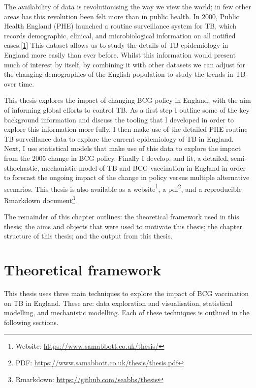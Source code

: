 \documentclass[11pt,twoside]{bristolthesis}
\begin{document}
  The availability of data is revolutionising the way we view the world; in few other areas has this revolution been felt more than in public health. In 2000, Public Health England (PHE) launched a routine surveillance system for TB, which records demographic, clinical, and microbiological information on all notified cases.{[}\protect\hyperlink{ref-PHE2017}{1}{]} This dataset allows us to study the details of TB epidemiology in England more easily than ever before. Whilst this information would present much of interest by itself, by combining it with other datasets we can adjust for the changing demographics of the English population to study the trends in TB over time.
  
  This thesis explores the impact of changing BCG policy in England, with the aim of informing global efforts to control TB. As a first step I outline some of the key background information and discuss the tooling that I developed in order to explore this information more fully. I then make use of the detailed PHE routine TB surveillance data to explore the current epidemiology of TB in England. Next, I use statistical models that make use of this data to explore the impact from the 2005 change in BCG policy. Finally I develop, and fit, a detailed, semi-sthochastic, mechanistic model of TB and BCG vaccination in England in order to forecast the ongoing impact of the change in policy versus multiple alternative scenarios. This thesis is also available as a website\footnote{Website: \url{https://www.samabbott.co.uk/thesis/}}, a pdf\footnote{PDF: \url{https://www.samabbott.co.uk/thesis/thesis.pdf}}, and a reproducible Rmarkdown document\footnote{Rmarkdown: \url{https://github.com/seabbs/thesis}}
  
  The remainder of this chapter outlines: the theoretical framework used in this thesis; the aims and objects that were used to motivate this thesis; the chapter structure of this thesis; and the output from this thesis.
  
  \hypertarget{theoretical-framework}{%
  \section{Theoretical framework}\label{theoretical-framework}}
  
  This thesis uses three main techniques to explore the impact of BCG vaccination on TB in England. These are: data exploration and visualisation, statistical modelling, and mechanistic modelling. Each of these techniques is outlined in the following sections.
  
\end{document}
